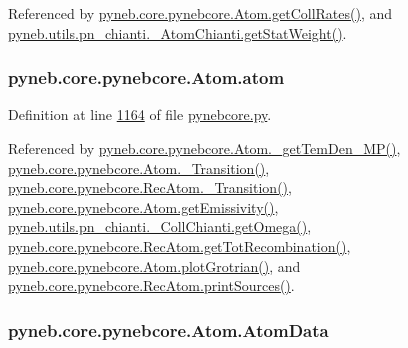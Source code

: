 Referenced by \hyperlink{pynebcore_8py_source_l01329}{pyneb.\+core.\+pynebcore.\+Atom.\+get\+Coll\+Rates()}, and \hyperlink{pn__chianti_8py_source_l00323}{pyneb.\+utils.\+pn\+\_\+chianti.\+\_\+\+Atom\+Chianti.\+get\+Stat\+Weight()}.

\hypertarget{classpyneb_1_1core_1_1pynebcore_1_1_atom_a192f3e20446d7fba81d789bc705d6c71}{}
\subsubsection[{atom}]{\setlength{\rightskip}{0pt plus 5cm}pyneb.\+core.\+pynebcore.\+Atom.\+atom}\label{classpyneb_1_1core_1_1pynebcore_1_1_atom_a192f3e20446d7fba81d789bc705d6c71}


Definition at line \hyperlink{pynebcore_8py_source_l01164}{1164} of file \hyperlink{pynebcore_8py_source}{pynebcore.\+py}.



Referenced by \hyperlink{pynebcore_8py_source_l01980}{pyneb.\+core.\+pynebcore.\+Atom.\+\_\+get\+Tem\+Den\+\_\+\+M\+P()}, \hyperlink{pynebcore_8py_source_l01367}{pyneb.\+core.\+pynebcore.\+Atom.\+\_\+\+Transition()}, \hyperlink{pynebcore_8py_source_l02696}{pyneb.\+core.\+pynebcore.\+Rec\+Atom.\+\_\+\+Transition()}, \hyperlink{pynebcore_8py_source_l01716}{pyneb.\+core.\+pynebcore.\+Atom.\+get\+Emissivity()}, \hyperlink{pn__chianti_8py_source_l00484}{pyneb.\+utils.\+pn\+\_\+chianti.\+\_\+\+Coll\+Chianti.\+get\+Omega()}, \hyperlink{pynebcore_8py_source_l02735}{pyneb.\+core.\+pynebcore.\+Rec\+Atom.\+get\+Tot\+Recombination()}, \hyperlink{pynebcore_8py_source_l02372}{pyneb.\+core.\+pynebcore.\+Atom.\+plot\+Grotrian()}, and \hyperlink{pynebcore_8py_source_l02796}{pyneb.\+core.\+pynebcore.\+Rec\+Atom.\+print\+Sources()}.

\hypertarget{classpyneb_1_1core_1_1pynebcore_1_1_atom_a7246a8b1ce71eb9d38f580a6ca9fe09e}{}
\subsubsection[{Atom\+Data}]{\setlength{\rightskip}{0pt plus 5cm}pyneb.\+core.\+pynebcore.\+Atom.\+Atom\+Data}\label{classpyneb_1_1core_1_1pynebcore_1_1_atom_a7246a8b1ce71eb9d38f580a6ca9fe09e}


